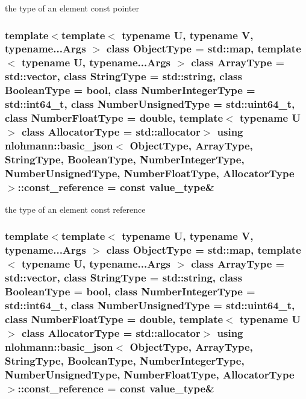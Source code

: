 the type of an element const pointer 

\hypertarget{classnlohmann_1_1basic__json_af677a29b0e66edc9f66e5167e4667071}{
\subsubsection[{const\-\_\-reference}]{\setlength{\rightskip}{0pt plus 5cm}template$<$template$<$ typename U, typename V, typename...\-Args $>$ class Object\-Type = std\-::map, template$<$ typename U, typename...\-Args $>$ class Array\-Type = std\-::vector, class String\-Type  = std\-::string, class Boolean\-Type  = bool, class Number\-Integer\-Type  = std\-::int64\-\_\-t, class Number\-Unsigned\-Type  = std\-::uint64\-\_\-t, class Number\-Float\-Type  = double, template$<$ typename U $>$ class Allocator\-Type = std\-::allocator$>$ using {\bf nlohmann\-::basic\-\_\-json}$<$ Object\-Type, Array\-Type, String\-Type, Boolean\-Type, Number\-Integer\-Type, Number\-Unsigned\-Type, Number\-Float\-Type, Allocator\-Type $>$\-::{\bf const\-\_\-reference} =  const {\bf value\-\_\-type}\&}}\label{classnlohmann_1_1basic__json_af677a29b0e66edc9f66e5167e4667071}


the type of an element const reference 

\hypertarget{classnlohmann_1_1basic__json_af677a29b0e66edc9f66e5167e4667071}{
\subsubsection[{const\-\_\-reference}]{\setlength{\rightskip}{0pt plus 5cm}template$<$template$<$ typename U, typename V, typename...\-Args $>$ class Object\-Type = std\-::map, template$<$ typename U, typename...\-Args $>$ class Array\-Type = std\-::vector, class String\-Type  = std\-::string, class Boolean\-Type  = bool, class Number\-Integer\-Type  = std\-::int64\-\_\-t, class Number\-Unsigned\-Type  = std\-::uint64\-\_\-t, class Number\-Float\-Type  = double, template$<$ typename U $>$ class Allocator\-Type = std\-::allocator$>$ using {\bf nlohmann\-::basic\-\_\-json}$<$ Object\-Type, Array\-Type, String\-Type, Boolean\-Type, Number\-Integer\-Type, Number\-Unsigned\-Type, Number\-Float\-Type, Allocator\-Type $>$\-::{\bf const\-\_\-reference} =  const {\bf value\-\_\-type}\&}}\label{classnlohmann_1_1basic__json_af677a29b0e66edc9f66e5167e4667071}


